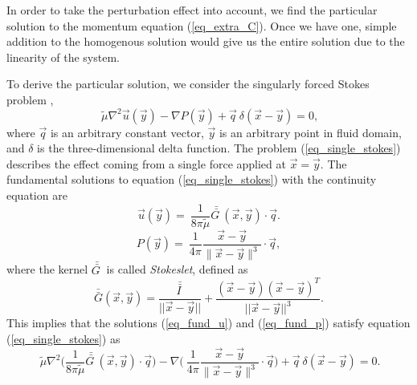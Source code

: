 In order to take the perturbation effect into account, we find the particular solution to the momentum equation (\ref{eq_extra_C}). Once we have one, simple addition to the homogenous solution would give us the entire solution due to the linearity of the system. 
\par
To derive the particular solution, we consider the singularly forced Stokes problem \cite{pozrikidis_boundary_1992},
\begin{equation}
	\ \tilde{\mu} \nabla^2 \vec{u}(\vec{y})
	- \nabla P (\vec{y})
	+\vec{q} \ \delta \left(\vec{x} - \vec{y} \right) =0,
\label{eq_single_stokes}
\end{equation}
where $\vec{q}$ is an arbitrary constant vector, $\vec{y}$ is an arbitrary point in fluid domain, and $\delta$ is the three-dimensional delta function.
The problem (\ref{eq_single_stokes}) 
describes the effect coming from a single force applied at $\vec{x} = \vec{y}.$
The fundamental solutions to equation (\ref{eq_single_stokes}) with the continuity equation are
\begin{equation}
	\vec{u} (\vec{y}) = \ \frac{1}{8\pi \tilde{\mu}}  \bar{\bar{G \ }}(\vec{x}, \vec{y})
	\cdot  \vec{q}.
\label{eq_fund_u}
\end{equation}
\begin{equation}
	P (\vec{y}) = \ \frac{1}{4\pi }  
	\frac{\vec{x} - \vec{y}}{\| \vec{x} - \vec{y}\|^3}
	\cdot  \vec{q},
\label{eq_fund_p}
\end{equation}
where the kernel $\bar{\bar{G \ }}$ is called \textit{Stokeslet}, defined as 
\begin{equation}
	\bar{\bar{G}}( \vec{x}, \vec{y}) = 
	\frac{\bar{\bar{I \ }}}{||\vec{x}-\vec{y} ||} + \frac{(\vec{x}-\vec{y})(\vec{x}-\vec{y})^T}{||\vec{x}-\vec{y} ||^3}.
\end{equation} 
This implies that the solutions (\ref{eq_fund_u}) and (\ref{eq_fund_p}) satisfy equation (\ref{eq_single_stokes}) as
\begin{equation}
	\ \tilde{\mu} \nabla^2 
	\biggl( \frac{1}{8\pi \tilde{\mu}}  \bar{\bar{G \ }}(\vec{x}, \vec{y})
	\cdot  \vec{q} \biggr)
	- \nabla \biggl(\ \frac{1}{4\pi }  
	\frac{\vec{x} - \vec{y}}{\| \vec{x} - \vec{y}\|^3}
	\cdot  \vec{q} \biggr)
	+ \vec{q} \ \delta \left(\vec{x} - \vec{y} \right)
	=0 .
\label{eq_single_stokes_sub}
\end{equation}
